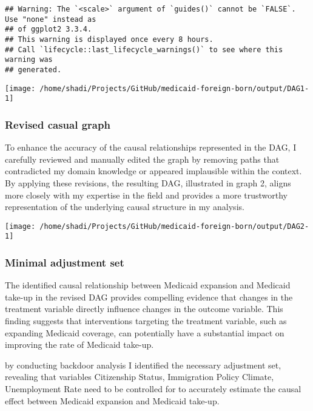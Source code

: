\documentclass[
]{article}
\begin{document}
\begin{verbatim}
## Warning: The `<scale>` argument of `guides()` cannot be `FALSE`. Use "none" instead as
## of ggplot2 3.3.4.
## This warning is displayed once every 8 hours.
## Call `lifecycle::last_lifecycle_warnings()` to see where this warning was
## generated.
\end{verbatim}

\begin{center}\texttt{[image: /home/shadi/Projects/GitHub/medicaid-foreign-born/output/DAG1-1]} \end{center}

\hypertarget{revised-casual-graph}{%
\subsubsection{Revised casual graph}\label{revised-casual-graph}}

To enhance the accuracy of the causal relationships represented in the
DAG, I carefully reviewed and manually edited the graph by removing
paths that contradicted my domain knowledge or appeared implausible
within the context. By applying these revisions, the resulting DAG,
illustrated in graph 2, aligns more closely with my expertise in the
field and provides a more trustworthy representation of the underlying
causal structure in my analysis.

\begin{center}\texttt{[image: /home/shadi/Projects/GitHub/medicaid-foreign-born/output/DAG2-1]} \end{center}

\hypertarget{minimal-adjustment-set}{%
\subsubsection{Minimal adjustment set}\label{minimal-adjustment-set}}

The identified causal relationship between Medicaid expansion and
Medicaid take-up in the revised DAG provides compelling evidence that
changes in the treatment variable directly influence changes in the
outcome variable. This finding suggests that interventions targeting the
treatment variable, such as expanding Medicaid coverage, can potentially
have a substantial impact on improving the rate of Medicaid take-up.

by conducting backdoor analysis I identified the necessary adjustment
set, revealing that variables Citizenship Status, Immigration Policy
Climate, Unemployment Rate need to be controlled for to accurately
estimate the causal effect between Medicaid expansion and Medicaid
take-up.
\end{document}
